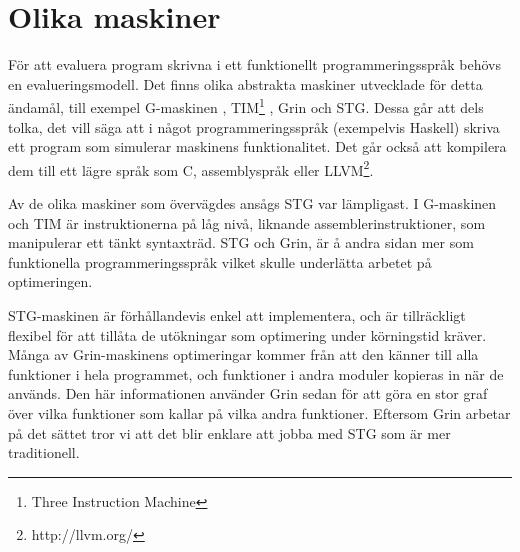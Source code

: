 \documentclass[../Core]{subfiles}
\begin{document}


\section{Olika maskiner}
\label{sec:Core:Mask}

För att evaluera program skrivna i ett funktionellt programmeringsspråk
behövs en evalueringsmodell. Det finns olika abstrakta maskiner utvecklade för
detta ändamål, till exempel G-maskinen \cite{G-machine}, TIM\footnote{Three Instruction Machine}\cite{TIM}
, Grin \cite{grin} och STG.
Dessa går att dels tolka, det vill säga att i något programmeringsspråk (exempelvis
Haskell) skriva ett program som simulerar maskinens funktionalitet. Det går också att
kompilera dem till ett lägre språk som C, assemblyspråk eller LLVM\footnote{http://llvm.org/}.


Av de olika maskiner som övervägdes ansågs STG var lämpligast. I G-maskinen och TIM  är
instruktionerna på låg nivå, liknande assemblerinstruktioner, som manipulerar
ett tänkt syntaxträd. STG och Grin, är å andra sidan mer som funktionella
programmeringsspråk vilket skulle underlätta arbetet på optimeringen.

STG-maskinen är förhållandevis enkel att implementera, och är tillräckligt flexibel för att
tillåta de utökningar som optimering under körningstid kräver.
Många av Grin-maskinens optimeringar kommer från att den känner till alla funktioner i hela
programmet, och funktioner i andra moduler kopieras in när de används. Den här informationen
använder Grin sedan för att göra en stor graf över vilka funktioner som kallar på
vilka andra funktioner. Eftersom Grin arbetar på det sättet tror vi att det blir enklare att jobba med STG 
som är mer traditionell.
\end{document}
